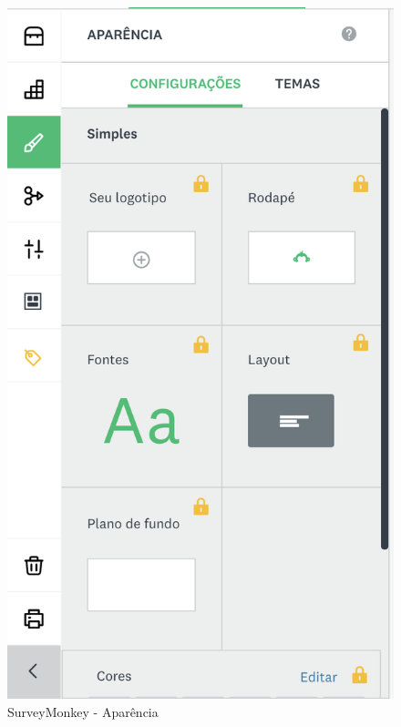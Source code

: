 \begin{figure}[ht!]
	\begin{center}
		\begin{minipage}{0.45\textwidth}
			\begin{center}
				\includegraphics[height=.32\textheight]{img/surveymonkey-form-aparencia}
				\caption{SurveyMonkey - Aparência}
				\label{fig:surveymonkey-form-aparencia}
			\end{center}
		\end{minipage}

\end{center}
\end{figure}
